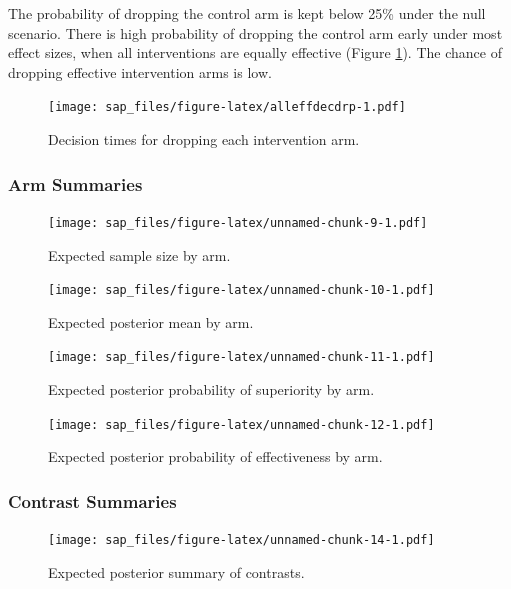 \documentclass[
  bibliography=totoc]{scrreprt}
\begin{document}
The probability of dropping the control arm is kept below 25\% under the null scenario.
There is high probability of dropping the control arm early under most effect sizes, when all interventions are equally effective (Figure \ref{fig:alleffdecdrp}).
The chance of dropping effective intervention arms is low.

\begin{figure}
\centering
\texttt{[image: sap\_files/figure-latex/alleffdecdrp-1.pdf]}
\caption{\label{fig:alleffdecdrp}Decision times for dropping each intervention arm.}
\end{figure}

\clearpage

\hypertarget{arm-summaries}{%
\subsubsection{Arm Summaries}\label{arm-summaries}}

\begin{figure}
\centering
\texttt{[image: sap\_files/figure-latex/unnamed-chunk-9-1.pdf]}
\caption{\label{fig:unnamed-chunk-9}Expected sample size by arm.}
\end{figure}

\begin{figure}
\centering
\texttt{[image: sap\_files/figure-latex/unnamed-chunk-10-1.pdf]}
\caption{\label{fig:unnamed-chunk-10}Expected posterior mean by arm.}
\end{figure}

\begin{figure}
\centering
\texttt{[image: sap\_files/figure-latex/unnamed-chunk-11-1.pdf]}
\caption{\label{fig:unnamed-chunk-11}Expected posterior probability of superiority by arm.}
\end{figure}

\begin{figure}
\centering
\texttt{[image: sap\_files/figure-latex/unnamed-chunk-12-1.pdf]}
\caption{\label{fig:unnamed-chunk-12}Expected posterior probability of effectiveness by arm.}
\end{figure}

\clearpage

\hypertarget{contrast-summaries}{%
\subsubsection{Contrast Summaries}\label{contrast-summaries}}

\begin{figure}
\centering
\texttt{[image: sap\_files/figure-latex/unnamed-chunk-14-1.pdf]}
\caption{\label{fig:unnamed-chunk-14}Expected posterior summary of contrasts.}
\end{figure}
\end{document}
